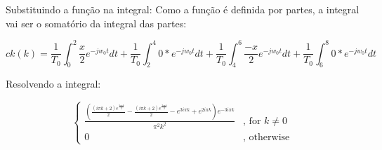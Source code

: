 \documentclass[11pt]{article}
\begin{document}
Substituindo a função na integral: Como a função é definida por partes,
a integral vai ser o somatório da integral das partes:

\[
ck(k) = \frac{1}{T_0} \int_{0}^{2} \frac{x}{2} e^{-j w_0 t}dt +
\frac{1}{T_0} \int_{2}^{4} 0 * e^{-j w_0 t}dt +
\frac{1}{T_0} \int_{4}^{6} \frac{-x}{2} e^{-j w_0 t}dt + 
\frac{1}{T_0} \int_{6}^{8} 0 * e^{-j w_0 t}dt
\]

Resolvendo a integral:

\[
 \begin{cases} \frac{\left(\frac{\left(i \pi k + 2\right) e^{\frac{5 i \pi k}{2}}}{2} - \frac{\left(i \pi k + 2\right) e^{\frac{3 i \pi k}{2}}}{2} - e^{3 i \pi k} + e^{2 i \pi k}\right) e^{- 3 i \pi k}}{\pi^{2} k^{2}} & \text{, for } k \neq 0 \\ 0 & \text{, otherwise} \end{cases} 
\]
\end{document}
